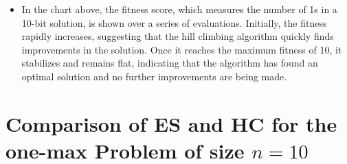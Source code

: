 \documentclass[
  letterpaper,
  DIV=11,
  numbers=noendperiod]{scrreprt}
\providecommand{\tightlist}{%
  \setlength{\itemsep}{0pt}\setlength{\parskip}{0pt}}\usepackage{longtable,booktabs,array}
\begin{document}
\begin{itemize}
\tightlist
\item
  In the chart above, the fitness score, which measures the number of 1s
  in a 10-bit solution, is shown over a series of evaluations.
  Initially, the fitness rapidly increases, suggesting that the hill
  climbing algorithm quickly finds improvements in the solution. Once it
  reaches the maximum fitness of 10, it stabilizes and remains flat,
  indicating that the algorithm has found an optimal solution and no
  further improvements are being made.
\end{itemize}

\section{\texorpdfstring{Comparison of ES and HC for the one-max Problem
of size
\(n=10\)}{Comparison of ES and HC for the one-max Problem of size n=10}}\label{comparison-of-es-and-hc-for-the-one-max-problem-of-size-n10}
\end{document}
